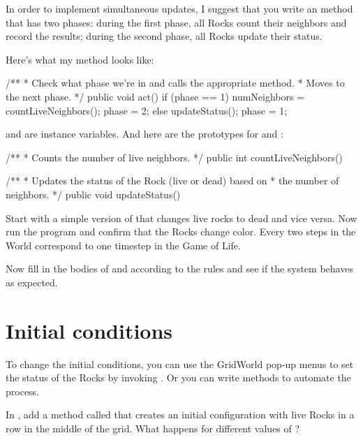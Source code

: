 In order to implement simultaneous updates, I suggest that you write an  method that has two phases: during the first phase, all Rocks count their neighbors and record the results; during the second phase, all Rocks update their status.

Here's what my  method looks like:

\begin{code}
    /**
     * Check what phase we're in and calls the appropriate method.
     * Moves to the next phase.
     */
    public void act() {
        if (phase == 1) {
            numNeighbors = countLiveNeighbors();
            phase = 2;
        } else {
            updateStatus();
            phase = 1;
        }
    }
\end{code}

 and  are instance variables.
And here are the prototypes for  and :

\begin{code}
    /**
     * Counts the number of live neighbors.
     */
    public int countLiveNeighbors()

    /**
     * Updates the status of the Rock (live or dead) based on
     * the number of neighbors.
     */
    public void updateStatus()
\end{code}

Start with a simple version of  that changes live rocks to dead and vice versa.
Now run the program and confirm that the Rocks change color.
Every two steps in the World correspond to one timestep in the Game of Life.

Now fill in the bodies of  and  according to the rules and see if the system behaves as expected.


\section{Initial conditions}

To change the initial conditions, you can use the GridWorld pop-up menus to set the status of the Rocks by invoking .
Or you can write methods to automate the process.

In , add a method called  that creates an initial configuration with  live Rocks in a row in the middle of the grid.
What happens for different values of ?

